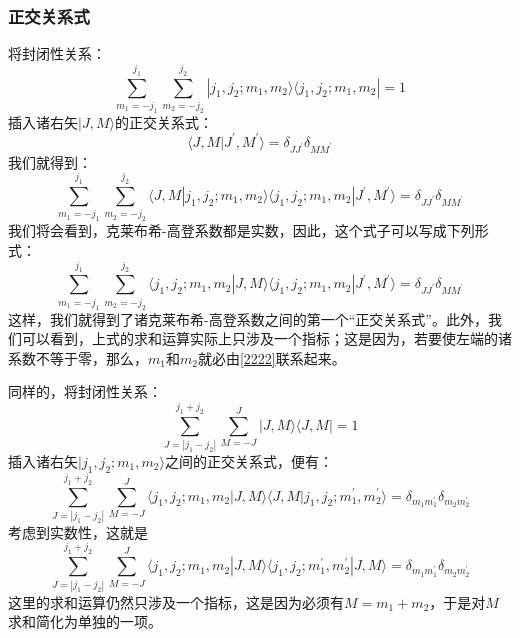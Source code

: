 \documentclass[]{article}
\begin{document}
\subsubsection{正交关系式}
将封闭性关系：
\begin{equation}
	\sum\limits_{m_1=-j_1}^{j_1}\sum\limits_{m_2=-j_2}^{j_2}|j_1,j_2;m_1,m_2\rangle\langle j_1,j_2;m_1,m_2|=1
\end{equation}
插入诸右矢$|J,M\rangle$的正交关系式：
\begin{equation}
	\langle J,M|J^\prime,M^\prime\rangle=\delta_{JJ^\prime}\delta_{MM^\prime}
\end{equation}
我们就得到：
\begin{equation}
	\sum\limits_{m_1=-j_1}^{j_1}\sum\limits_{m_2=-j_2}^{j_2}\langle J,M|j_1,j_2;m_1,m_2\rangle\langle j_1,j_2;m_1,m_2|J^\prime,M^\prime\rangle=\delta_{JJ^\prime}\delta_{MM^\prime}
\end{equation}
我们将会看到，克莱布希-高登系数都是实数，因此，这个式子可以写成下列形式：
\begin{equation}
	\sum\limits_{m_1=-j_1}^{j_1}\sum\limits_{m_2=-j_2}^{j_2}\langle j_1,j_2;m_1,m_2|J,M\rangle\langle j_1,j_2;m_1,m_2|J^\prime,M^\prime\rangle=\delta_{JJ^\prime}\delta_{MM^\prime}
\end{equation}
这样，我们就得到了诸克莱布希-高登系数之间的第一个“正交关系式”。此外，我们可以看到，上式的求和运算实际上只涉及一个指标；这是因为，若要使左端的诸系数不等于零，那么，$m_1$和$m_2$就必由\eqref{2222}联系起来。\par
同样的，将封闭性关系：
\begin{equation}
	\sum\limits_{J=|j_1-j_2|}^{j_1+j_2}\sum\limits_{M=-J}^{J}|J,M\rangle\langle J,M|=1
\end{equation}
插入诸右矢$|j_1,j_2;m_1,m_2\rangle$之间的正交关系式，便有：
\begin{equation}
	\sum\limits_{J=|j_1-j_2|}^{j_1+j_2}\sum\limits_{M=-J}^{J}\langle j_1,j_2;m_1,m_2|J,M\rangle\langle J,M|j_1,j_2;m_1^\prime,m_2^\prime\rangle=\delta_{m_1m_1^\prime}\delta_{m_2m_2^\prime}
\end{equation}
考虑到实数性，这就是
\begin{equation}
	\sum\limits_{J=|j_1-j_2|}^{j_1+j_2}\sum\limits_{M=-J}^{J}\langle j_1,j_2;m_1,m_2|J,M\rangle\langle j_1,j_2;m_1^\prime,m_2^\prime|J,M\rangle=\delta_{m_1m_1^\prime}\delta_{m_2m_2^\prime}
\end{equation}
这里的求和运算仍然只涉及一个指标，这是因为必须有$M=m_1+m_2$，于是对$M$求和简化为单独的一项。
\end{document}
